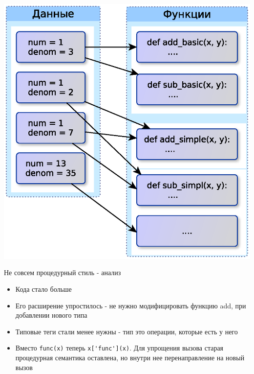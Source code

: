 \documentclass{article}
\begin{document}
\begin{center} \includegraphics{images/semi_OOP_style.eps} \end{center} 
\newpage

\begin{center} Не совсем процедурный стиль - анализ \end{center}
\begin{itemize}
    \item Кода стало больше
    \item Его расширение упростилось - не нужно модифицировать функцию add,
          при добавлении нового типа
    \item Типовые теги стали менее нужны - тип это операции, которые есть у него
    \item Вместо \lstinline!func(x)! теперь \lstinline!x['func'](x)!. 
          Для упрощения вызова старая процедурная семантика оставлена,
          но внутри нее перенаправление на новый вызов
\end{itemize}
\newpage
\end{document}
